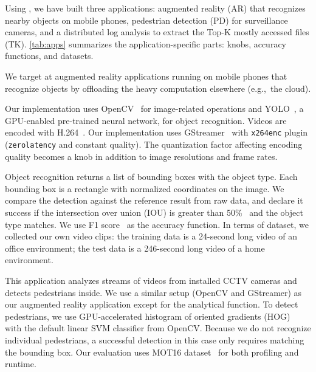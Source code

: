Using \sysname{}, we have built three applications: augmented reality (AR) that
recognizes nearby objects on mobile phones, pedestrian detection (PD) for
surveillance cameras, and a distributed log analysis to extract the Top-K mostly
accessed files (TK). \autoref{tab:apps} summarizes the application-specific
parts: knobs, accuracy functions, and datasets.

 We target at augmented reality applications running on
mobile phones that recognize objects by offloading the heavy computation
elsewhere (e.g.,~the cloud).

Our implementation uses OpenCV~\cite{opencvlibrary} for image-related operations
and YOLO~\cite{darknet13, redmon2016yolo9000}, a GPU-enabled pre-trained neural
network, for object recognition. Videos are encoded with
H.264~\cite{richardson2011h}. Our implementation uses GStreamer~\cite{gstreamer}
with \texttt{x264enc} plugin (\texttt{zerolatency} and constant quality). The
quantization factor affecting encoding quality becomes a knob in addition to
image resolutions and frame rates.

Object recognition returns a list of bounding boxes with the object type. Each
bounding box is a rectangle with normalized coordinates on the image. We compare
the detection against the reference result from raw data, and declare it success
if the intersection over union (IOU) is greater than
50\%~\cite{everingham2010pascal} and the object type matches. We use F1
score~\cite{Rijsbergen:1979:IR:539927} as the accuracy function. In terms of
dataset, we collected our own video clips: the training data is a 24-second long
video of an office environment; the test data is a 246-second long video of a
home environment.

 This application analyzes streams of videos from
installed CCTV cameras and detects pedestrians inside. We use a similar setup
(OpenCV and GStreamer) as our augmented reality application except for the
analytical function. To detect pedestrians, we use GPU-accelerated histogram of
oriented gradients (HOG)~\cite{dalal2005histograms} with the default linear SVM
classifier from OpenCV. Because we do not recognize individual pedestrians, a
successful detection in this case only requires matching the bounding box. Our
evaluation uses MOT16 dataset~\cite{milan2016mot16} for both profiling and
runtime.

